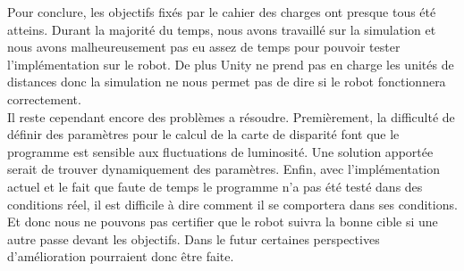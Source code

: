 \documentclass[12pt,a4paper]{report}
\begin{document}
Pour conclure, les objectifs fixés par le cahier des charges ont presque tous été atteins. Durant la majorité du temps, nous avons travaillé sur la simulation et nous avons malheureusement pas eu assez de temps pour pouvoir tester l'implémentation sur le robot. De plus Unity ne prend pas en charge les unités de distances donc la simulation ne  nous permet pas de dire si le robot fonctionnera correctement.\\
Il reste cependant encore des problèmes a résoudre. Premièrement, la difficulté de définir des paramètres pour le calcul de la carte de disparité font que le programme est sensible aux fluctuations de luminosité. Une solution apportée serait de trouver dynamiquement des paramètres. Enfin, avec l'implémentation actuel et le fait que faute de temps le programme n'a pas été testé dans des conditions réel, il est difficile à dire comment il se comportera dans ses conditions. Et donc nous ne pouvons pas certifier que le robot suivra la bonne cible si une autre passe devant les objectifs. Dans le futur certaines perspectives d'amélioration pourraient donc être faite.
\end{document}
